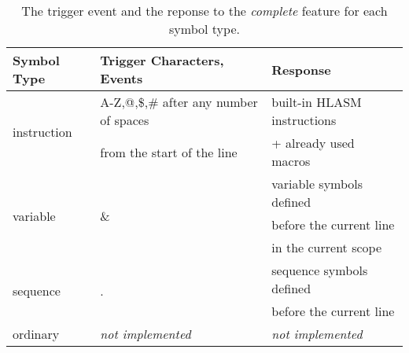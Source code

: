 \begin{table}[h]
	\centering
	\begin{tabular}{lll}
		\toprule
		\textbf{Symbol Type}            & \textbf{Trigger Characters, Events}     & \textbf{Response}  \\ \midrule
		\multirow{2}{3cm}{instruction}  &  A-Z,@,\$,\# after any number of spaces & built-in HLASM instructions\\ 
	                                   	& from the start of the line              & + already used macros     \\ \midrule
		\multirow{3}{3cm}{variable}     & \multirow{3}{4cm}{\&}                   & variable symbols defined \\ 
	 	                                &                                         & before the current line  \\ 
	 	                                &                                         & in the current scope \\ \midrule
		\multirow{2}{3cm}{sequence}     & \multirow{2}{4cm}{.}                    & sequence symbols defined \\ 
										&                                         & before the current line  \\ \midrule
		ordinary                        & \textit{not implemented}                & \textit{not implemented} \\
		\bottomrule
	\end{tabular}
	\caption{The trigger event and the reponse to the \emph{complete} feature for each symbol type.}
\end{table}



